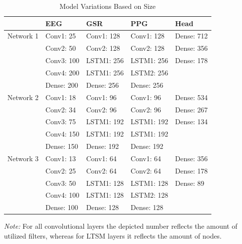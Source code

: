 \documentclass[12pt]{article}
\begin{document}
\bgroup
\def\arraystretch{1.6}%
\begin{table}[h]
\caption{Model Variations Based on Size}
\label{table:modelvariations}
\begin{tabular}{lllll}
\hline
        & EEG        & GSR        & PPG        & Head       \\ \hline
Network 1 & Conv1: 25  & Conv1: 128 & Conv1: 128 & Dense: 712 \\
        & Conv2: 50  & Conv2: 128 & Conv2: 128 & Dense: 356 \\
        & Conv3: 100 & LSTM1: 256 & LSTM1: 256 & Dense: 178 \\
        & Conv4: 200 & LSTM1: 256 & LSTM2: 256 &            \\ 
        \vspace{3ex}
        & Dense: 200 & Dense: 256 & Dense: 256 &            \\ \hline
Network 2 & Conv1: 18  & Conv1: 96  & Conv1: 96  & Dense: 534 \\
        & Conv2: 34  & Conv2: 96  & Conv2: 96  & Dense: 267 \\
        & Conv3: 75  & LSTM1: 192 & LSTM1: 192 & Dense: 134 \\
        & Conv4: 150 & LSTM1: 192 & LSTM1: 192 &            \\
        \vspace{3ex}
        & Dense: 150 & Dense: 192 & Dense: 192 &            \\ \hline
Network 3 & Conv1: 13  & Conv1: 64  & Conv1: 64  & Dense: 356 \\
        & Conv2: 25  & Conv2: 64  & Conv2: 64  & Dense: 178 \\
        & Conv3: 50  & LSTM1: 128 & LSTM1: 128 & Dense: 89  \\
        & Conv4: 100 & LSTM1: 128 & LSTM2: 128 &            \\
        & Dense: 100 & Dense: 128 & Dense: 128 &            \\ \hline
\end{tabular}
\vspace{2ex}

\begin{doublespacing}
{\raggedright \textit{Note:} For all convolutional layers the depicted number reflects the amount of utilized filters, whereas for LTSM layers it reflects the amount  of nodes. \par}
\end{doublespacing}
\end{table}
\egroup
\end{document}
